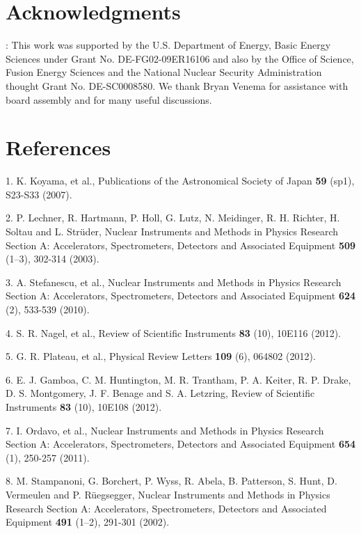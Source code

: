 \section{Acknowledgments}: This work was supported by the U.S.
Department of Energy, Basic Energy Sciences under Grant No.
DE-FG02-09ER16106 and also by the Office of Science, Fusion Energy
Sciences and the National Nuclear Security Administration thought Grant
No. DE-SC0008580. We thank Bryan Venema for assistance with board
assembly and for many useful discussions.

\section{References}

1. K. Koyama, et al., Publications of the
Astronomical Society of Japan \textbf{59} (sp1), S23-S33 (2007).

2. P. Lechner, R. Hartmann, P. Holl, G.
Lutz, N. Meidinger, R. H. Richter, H. Soltau and L. Strüder, Nuclear
Instruments and Methods in Physics Research Section A: Accelerators,
Spectrometers, Detectors and Associated Equipment \textbf{509} (1--3),
302-314 (2003).

3. A. Stefanescu, et al., Nuclear
Instruments and Methods in Physics Research Section A: Accelerators,
Spectrometers, Detectors and Associated Equipment \textbf{624} (2),
533-539 (2010).

4. S. R. Nagel, et al., Review of
Scientific Instruments \textbf{83} (10), 10E116 (2012).

5. G. R. Plateau, et al., Physical Review
Letters \textbf{109} (6), 064802 (2012).

6. E. J. Gamboa, C. M. Huntington, M. R.
Trantham, P. A. Keiter, R. P. Drake, D. S. Montgomery, J. F. Benage and
S. A. Letzring, Review of Scientific Instruments \textbf{83} (10),
10E108 (2012).

7. I. Ordavo, et al., Nuclear Instruments
and Methods in Physics Research Section A: Accelerators, Spectrometers,
Detectors and Associated Equipment \textbf{654} (1), 250-257 (2011).

8. M. Stampanoni, G. Borchert, P. Wyss,
R. Abela, B. Patterson, S. Hunt, D. Vermeulen and P. Rüegsegger, Nuclear
Instruments and Methods in Physics Research Section A: Accelerators,
Spectrometers, Detectors and Associated Equipment \textbf{491} (1--2),
291-301 (2002).

